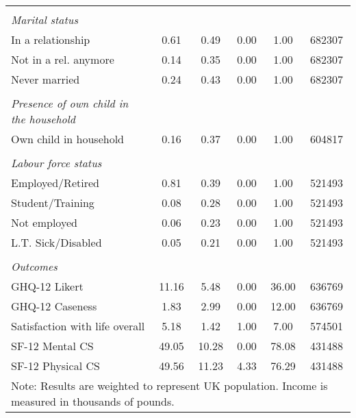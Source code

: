 {\begin{longtable}{l*{1}{ccccc}}
\vspace{0.05cm} \\ \emph{Marital status}&         &         &         &         &         \\
In a relationship&     0.61&     0.49&     0.00&     1.00&   682307\\
Not in a rel. anymore&     0.14&     0.35&     0.00&     1.00&   682307\\
Never married   &     0.24&     0.43&     0.00&     1.00&   682307\\
\vspace{0.05cm} \\ \emph{Presence of own child in the household}&         &         &         &         &         \\
Own child in household&     0.16&     0.37&     0.00&     1.00&   604817\\
\vspace{0.05cm} \\ \emph{Labour force status}&         &         &         &         &         \\
Employed/Retired&     0.81&     0.39&     0.00&     1.00&   521493\\
Student/Training&     0.08&     0.28&     0.00&     1.00&   521493\\
Not employed    &     0.06&     0.23&     0.00&     1.00&   521493\\
L.T. Sick/Disabled&     0.05&     0.21&     0.00&     1.00&   521493\\
\vspace{0.05em} \\ \emph{Outcomes}&         &         &         &         &         \\
GHQ-12 Likert   &    11.16&     5.48&     0.00&    36.00&   636769\\
GHQ-12 Caseness &     1.83&     2.99&     0.00&    12.00&   636769\\
Satisfaction with life overall&     5.18&     1.42&     1.00&     7.00&   574501\\
SF-12 Mental CS &    49.05&    10.28&     0.00&    78.08&   431488\\
SF-12 Physical CS&    49.56&    11.23&     4.33&    76.29&   431488\\
\bottomrule
\multicolumn{6}{l}{\footnotesize Note: Results are weighted to represent UK population. Income is measured in thousands of pounds.}\\
\end{longtable}
}
